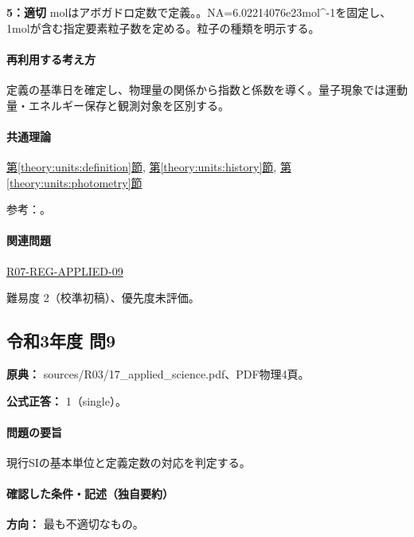 \noindent\textbf{5：適切} molはアボガドロ定数で定義。。NA=\allowbreak{}6.02214076e23mol\textasciicircum{}-1を固定し、1molが含む指定要素粒子数を定める。粒子の種類を明示する。\par

\paragraph{再利用する考え方} 定義の基準日を確定し、物理量の関係から指数と係数を導く。量子現象では運動量・エネルギー保存と観測対象を区別する。

\paragraph{共通理論} \hyperref[theory:units:definition]{第\ref*{theory:units:definition}節}, \hyperref[theory:units:history]{第\ref*{theory:units:history}節}, \hyperref[theory:units:photometry]{第\ref*{theory:units:photometry}節}

\par 参考：\cite{si_cgpm2018,si_brochure9}。

\paragraph{関連問題} \hyperref[q:r07-reg-applied-09]{R07-REG-APPLIED-09}

\par 難易度 2（校準初稿）、優先度未評価。

\subsection{令和3年度 問9}
\label{q:r03-reg-applied-09}

\noindent\textbf{原典：} sources/R03/17\_applied\_science.pdf、PDF物理4頁。

\textbf{公式正答：} 1（single）。

\paragraph{問題の要旨} 現行SIの基本単位と定義定数の対応を判定する。

\paragraph{確認した条件・記述（独自要約）}\mbox{}\par

\noindent\textbf{方向：} 最も不適切なもの。\par

